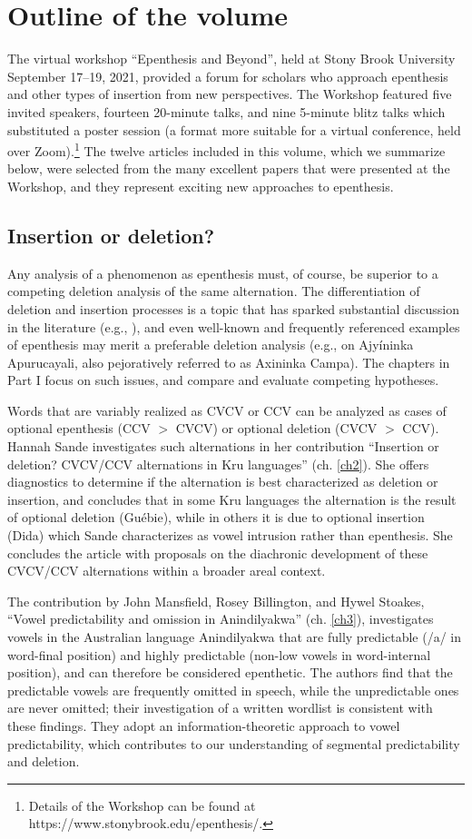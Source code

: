 \documentclass[output=paper,colorlinks,citecolor=brown]{langscibook}
\begin{document}
\section{Outline of the volume}\label{outline}
The virtual workshop “Epenthesis and Beyond”, held at Stony Brook University September 17--19, 2021, provided a forum for scholars who approach epenthesis and other types of insertion from new perspectives. The Workshop featured five invited speakers, fourteen 20-minute talks, and nine 5-minute blitz talks which substituted a poster session (a format more suitable for a virtual conference, held over Zoom).\footnote{Details of the Workshop can be found at https://www.stonybrook.edu/epenthesis/.} The twelve articles included in this volume, which we summarize below, were selected from the many excellent papers that were presented at the Workshop, and they represent exciting new approaches to epenthesis.

\subsection{Insertion or deletion?}
Any analysis of a phenomenon as epenthesis must, of course, be superior to a competing deletion analysis of the same alternation. The differentiation of deletion and insertion processes is a topic that has sparked substantial discussion in the literature (e.g., \citealt{Morley2015}), and even well-known and frequently referenced examples of epenthesis may merit a preferable deletion analysis (e.g., \citealt{Staroverov2015} on Ajyíninka Apurucayali, also pejoratively referred to as Axininka Campa). The chapters in Part I focus on such issues, and compare and evaluate competing hypotheses.

Words that are variably realized as CVCV or CCV can be analyzed as cases of optional epenthesis (CCV $>$ CVCV) or optional deletion (CVCV $>$ CCV). Hannah Sande investigates such alternations in her contribution “Insertion or deletion? CVCV/CCV alternations in Kru languages” (ch. \ref{ch2}). She offers diagnostics to determine if the alternation is best characterized as deletion or insertion, and concludes that in some Kru languages the alternation is the result of optional deletion (Guébie), while in others it is due to optional insertion (Dida) which Sande characterizes as vowel intrusion rather than epenthesis. She concludes the article with proposals on the diachronic development of these CVCV/CCV alternations within a broader areal context.

The contribution by John Mansfield, Rosey Billington, and Hywel Stoakes, “Vowel predictability and omission in Anindilyakwa” (ch. \ref{ch3}), investigates vowels in the Australian language Anindilyakwa that are fully predictable (/a/ in word-final position) and highly predictable (non-low vowels in word-internal position), and can therefore be considered epenthetic. The authors find that the predictable vowels are frequently omitted in speech, while the unpredictable ones are never omitted; their investigation of a written wordlist is consistent with these findings. They adopt an information-theoretic approach to vowel predictability, which contributes to our understanding of segmental predictability and deletion.
\end{document}
